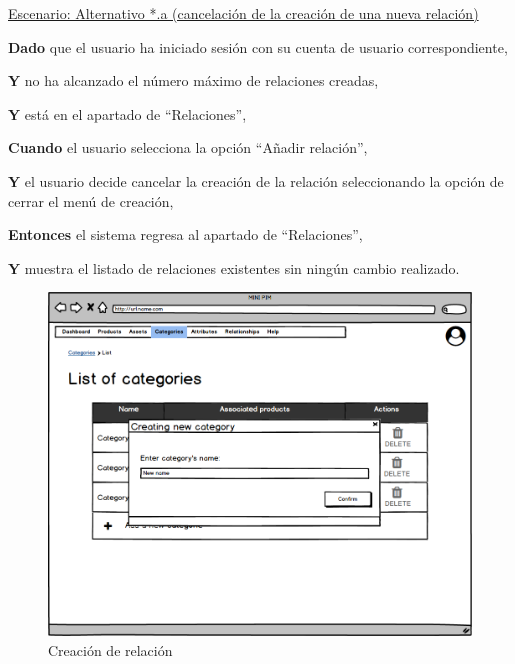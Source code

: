 \underline{Escenario: Alternativo *.a (cancelación de la creación de una nueva relación)}\par
\vspace{0.15cm}
\textbf{Dado} que el usuario ha iniciado sesión con su cuenta de usuario correspondiente,\par
\textbf{Y} no ha alcanzado el número máximo de relaciones creadas,\par
\textbf{Y} está en el apartado de \enquote{Relaciones},\par
\textbf{Cuando} el usuario selecciona la opción \enquote{Añadir relación},\par
\textbf{Y} el usuario decide cancelar la creación de la relación seleccionando la opción de cerrar el menú de creación,\par
\textbf{Entonces} el sistema regresa al apartado de \enquote{Relaciones},\par
\textbf{Y} muestra el listado de relaciones existentes sin ningún cambio realizado.\par

\vspace{0.20cm}

\begin{figure}[H]
    \includegraphics[width=1\linewidth]{assets/mockups/RF4.1_1.png}
    \caption{Creación de relación}
   \end{figure}
\vspace{1.0cm}

